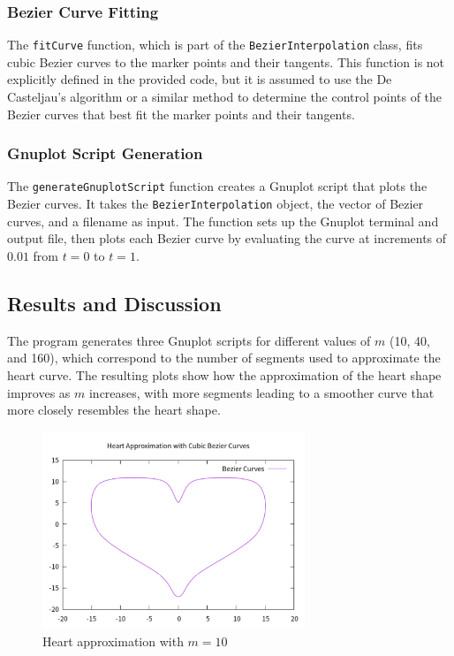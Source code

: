 \documentclass{article}
\begin{document}
\subsubsection{Bezier Curve Fitting}
The \texttt{fitCurve} function, which is part of the \texttt{BezierInterpolation} class, fits cubic Bezier curves to the marker points and their tangents. This function is not explicitly defined in the provided code, but it is assumed to use the De Casteljau's algorithm or a similar method to determine the control points of the Bezier curves that best fit the marker points and their tangents.

\subsubsection{Gnuplot Script Generation}
The \texttt{generateGnuplotScript} function creates a Gnuplot script that plots the Bezier curves. It takes the \texttt{BezierInterpolation} object, the vector of Bezier curves, and a filename as input. The function sets up the Gnuplot terminal and output file, then plots each Bezier curve by evaluating the curve at increments of \(0.01\) from \(t = 0\) to \(t = 1\).

\subsection{Results and Discussion}
The program generates three Gnuplot scripts for different values of \(m\) (10, 40, and 160), which correspond to the number of segments used to approximate the heart curve. The resulting plots show how the approximation of the heart shape improves as \(m\) increases, with more segments leading to a smoother curve that more closely resembles the heart shape.

\begin{figure}[H]
    \centering
    \includegraphics[width=0.7\textwidth]{10.png}
    \caption{Heart approximation with \(m = 10\)}
    \label{fig:heart10}
\end{figure}
\end{document}
